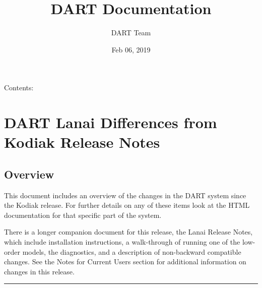 \documentclass[letterpaper,10pt,english]{sphinxmanual}
\title{DART Documentation}
\date{Feb 06, 2019}
\author{DART Team}
\begin{document}
\maketitle
\tableofcontents
{}\label{index::doc}


Contents:


\chapter{DART Lanai Differences from Kodiak Release Notes}
\label{docs/Lanai_diffs_from_Kodiak::doc}\label{docs/Lanai_diffs_from_Kodiak:dart-lanai-differences-from-kodiak-release-notes}\label{docs/Lanai_diffs_from_Kodiak:welcome-to-dart-s-documentation}

\section{Overview}
\label{docs/Lanai_diffs_from_Kodiak:overview}
This document includes an overview of the changes in the DART system
since the Kodiak release. For further details on any of these items look
at the HTML documentation for that specific part of the system.

There is a longer companion document for this release, the Lanai
Release Notes, which include installation instructions, a walk-through of running one
of the low-order models, the diagnostics, and a description of
non-backward compatible changes. See the Notes for Current
Users section for additional information on changes in this release.


\bigskip\hrule{}\bigskip
\end{document}
